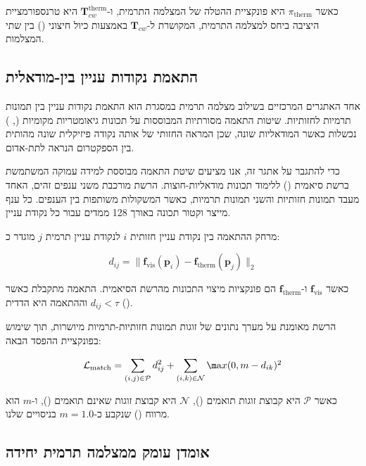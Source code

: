 כאשר $\pi_{\text{therm}}$ היא פונקציית ההטלה של המצלמה התרמית, ו-$\mathbf{T}_{cw}^{\text{therm}}$ היא טרנספורמציית היציבה ביחס למצלמה התרמית, המקושרת ל-$\mathbf{T}_{cw}$ באמצעות כיול חיצוני () בין שתי המצלמות.

\subsection{התאמת נקודות עניין בין-מודאלית}
\label{sec:ch04_cross_modal_matching}

אחד האתגרים המרכזיים בשילוב מצלמה תרמית במסגרת  הוא התאמת נקודות עניין בין תמונות תרמיות לחזותיות. שיטות התאמה מסורתיות המבוססות על תכונות גיאומטריות מקומיות (, ) נכשלות כאשר המודאליות שונה, שכן המראה החזותי של אותה נקודה פיזיקלית שונה מהותית בין הספקטרום הנראה לתת-אדום.

כדי להתגבר על אתגר זה, אנו מציעים שיטת התאמה מבוססת למידה עמוקה המשתמשת ברשת סיאמית () ללימוד תכונות מודאליות-חוצות. הרשת מורכבת משני ענפים זהים, האחד מעבד תמונות חזותיות והשני תמונות תרמיות, כאשר המשקולות משותפות בין הענפים. כל ענף מייצר וקטור תכונה באורך 128 ממדים עבור כל נקודת עניין.

מרחק ההתאמה בין נקודת עניין חזותית $i$ לנקודת עניין תרמית $j$ מוגדר כ:

\begin{equation}
d_{ij} = \| \mathbf{f}_{\text{vis}}(\mathbf{p}_i) - \mathbf{f}_{\text{therm}}(\mathbf{p}_j) \|_2
\label{eq:ch04_feature_distance}
\end{equation}

כאשר $\mathbf{f}_{\text{vis}}$ ו-$\mathbf{f}_{\text{therm}}$ הם פונקציות מיצוי התכונות מהרשת הסיאמית. התאמה מתקבלת כאשר $d_{ij} < \tau$ וההתאמה היא הדדית ().

הרשת מאומנת על מערך נתונים של זוגות תמונות חזותיות-תרמיות מיושרות, תוך שימוש בפונקציית ההפסד הבאה:

\begin{equation}
\mathcal{L}_{\text{match}} = \sum_{(i,j) \in \mathcal{P}} d_{ij}^2 + \sum_{(i,k) \in \mathcal{N}} \m$a$x(0, m - d_{ik})$$^2
\label{eq:ch04_contrastive_loss}
\end{equation}

כאשר $\mathcal{P}$ היא קבוצת זוגות תואמים (), $\mathcal{N}$ היא קבוצת זוגות שאינם תואמים (), ו-$m$ הוא מרווח () שנקבע כ-$m = 1.0$ בניסויים שלנו.

\subsection{אומדן עומק ממצלמה תרמית יחידה}
\label{sec:ch04_depth_estimation}

